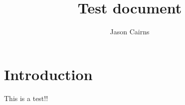 \documentclass{article}
\begin{document}
    \title{Test document}
    \author{Jason Cairns}
      
    \maketitle

\section{Introduction}
This is a test!!
\end{document}
